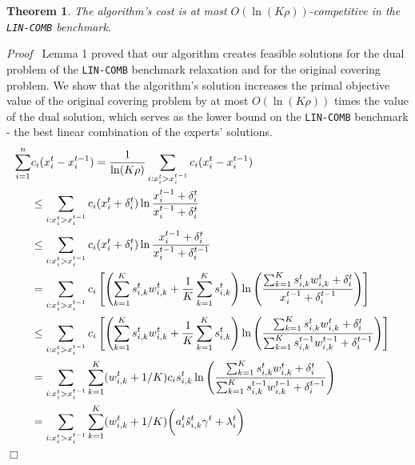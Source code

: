 \documentclass[a4paper]{article}
\newenvironment{proof}{\noindent\emph{Proof\ }}{\hspace*{\fill}$\Box$\medskip}
\newtheorem{theorem}{Theorem}
\begin{document}
\begin{theorem} \label{covering-theorem}
The algorithm's cost is at most $O(\ln(K \rho))$-competitive in the \texttt{LIN-COMB} benchmark.
\end{theorem}
%
\begin{proof} Lemma 1 proved that our algorithm creates feasible solutions for the dual problem of the \texttt{LIN-COMB} benchmark relaxation and for the original covering problem. We show that the algorithm's solution increases the primal objective value of the original covering problem by at most $O(\ln(K \rho))$ times the value of the dual solution, which serves as the lower bound on the \texttt{LIN-COMB} benchmark - the best linear combination of the experts' solutions.
\begin{align}
	 \sum_{i=1}^{n} &c_{i} (x_{i}^{t} - x_{i}^{t-1})
		= \frac{1}{\ln(K\rho)} \sum_{i: x_{i}^{t} > x_{i}^{t-1}} c_{i}(x_{i}^{t} - x_{i}^{t-1}) &&  \notag \\
		&\leq \sum_{i: x_{i}^{t} > x_{i}^{t-1}} c_{i}(x_{i}^{t} + \delta_{i}^{t}) \ln \frac{x_{i}^{t-1} + \delta_{i}^{t}}{x_{i}^{t-1} + \delta_{i}^{t}} \\
		&\leq \sum_{i: x_{i}^{t} > x_{i}^{t-1}} c_{i} (x_{i}^{t} + \delta_{i}^{t}) \ln \frac{x_{i}^{t-1} + \delta_{i}^{t}}{x_{i}^{t-1} + \delta_{i}^{t-1}} \\
		&= \sum_{i: x_{i}^{t} > x_{i}^{t-1}} c_{i} \left[ \left(\sum_{k=1}^{K}  s_{i,k}^{t} w_{i,k}^{t} + \frac{1}{K} \sum_{k=1}^{K} s_{i,k}^{t} \right)
			\ln \left(\frac{ \sum_{k=1}^{K}  s_{i,k}^{t} w_{i,k}^{t} + \delta_{i}^{t}}{x_{i}^{t-1} + \delta_{i}^{t-1}}  \right) \right] \\
%
&\leq \sum_{i: x_{i}^{t} > x_{i}^{t-1}} c_{i} \left[ \left(\sum_{k=1}^{K}  s_{i,k}^{t} w_{i,k}^{t} + \frac{1}{K} \sum_{k=1}^{K} s_{i,k}^{t} \right)
			\ln \left(\frac{ \sum_{k=1}^{K}  s_{i,k}^{t} w_{i,k}^{t} + \delta_{i}^{t}}{\sum_{k=1}^{K}  s_{i,k}^{t-1} w_{i,k}^{t-1} + \delta_{i}^{t-1}}  \right) \right]\\
%
	&= \sum_{i: x_{i}^{t} > x_{i}^{t-1}} \sum_{k=1}^{K} (w_{i,k}^{t} + 1/K) c_{i} s_{i,k}^{t}
				\ln \left(\frac{ \sum_{k=1}^{K} s_{i,k}^{t} w_{i,k}^{t}  + \delta_{i}^{t}}{\sum_{k=1}^{K}  s_{i,k}^{t-1} w_{i,k}^{t-1}  + \delta_{i}^{t-1}}  \right) \notag \\
%
%
&=  \sum_{i: x_{i}^{t} > x_{i}^{t-1}} \sum_{k=1}^{K} (w_{i,k}^{t} + 1/K) \biggl( a_{i}^{t} \hat{s}_{i,k}^{t} \gamma^t + \lambda_{i}^{t} \biggr) \\

\end{align}
\end{proof}
\end{document}
